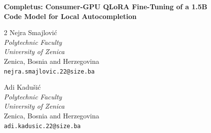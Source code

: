 \documentclass[12pt,letterpaper]{article}
\begin{document}

\begin{center}
  {\Large\bfseries
    Completus: Consumer-GPU QLoRA Fine-Tuning of a 1.5B\\[2pt]
    Code Model for Local Autocompletion
  }
  \vspace{18pt}

  \begin{multicols}{2}
    \centering
    {\normalsize Nejra Smajlovi\'{c}}\\[2pt]
    \textit{Polytechnic Faculty}\\
    \textit{University of Zenica}\\
    Zenica, Bosnia and Herzegovina\\
    \texttt{nejra.smajlovic.22@size.ba}

    \columnbreak

    {\normalsize Adi Kadu\v{s}i\'{c}}\\[2pt]
    \textit{Polytechnic Faculty}\\
    \textit{University of Zenica}\\
    Zenica, Bosnia and Herzegovina\\
    \texttt{adi.kadusic.22@size.ba}
  \end{multicols}
\end{center}

\vspace{6pt}








\end{document}
